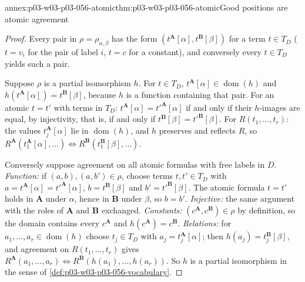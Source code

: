 \begin{annexitem}{annex:p03-w03-p03-056-atomic}{thm:p03-w03-p03-056-atomic}{Good positions are atomic agreement}
\begin{proof}
Every pair in \(\rho=\rho_{\alpha,\beta}\) has the form
\((t^{\mathbf A}[\alpha],t^{\mathbf B}[\beta])\) for a term \(t\in T_D\)
(\(t=v_i\) for the pair of label \(i\), \(t=c\) for a constant), and
conversely every \(t\in T_D\) yields such a pair.

Suppose \(\rho\) is a partial isomorphism \(h\). For \(t\in T_D\),
\(t^{\mathbf A}[\alpha]\in\operatorname{dom}(h)\) and
\(h(t^{\mathbf A}[\alpha])=t^{\mathbf B}[\beta]\), because \(h\) is a function
containing that pair. For an atomic \(t=t'\) with terms in \(T_D\):
\(t^{\mathbf A}[\alpha]=t'^{\mathbf A}[\alpha]\) if and only if their
\(h\)-images are equal, by injectivity, that is, if and only if
\(t^{\mathbf B}[\beta]=t'^{\mathbf B}[\beta]\). For \(R(t_1,\ldots,t_r)\): the
values \(t_j^{\mathbf A}[\alpha]\) lie in \(\operatorname{dom}(h)\), and
\(h\) preserves and reflects \(R\), so
\(R^{\mathbf A}(t_1^{\mathbf A}[\alpha],\ldots)\iff
R^{\mathbf B}(t_1^{\mathbf B}[\beta],\ldots)\).

Conversely suppose agreement on all atomic formulas with free labels in
\(D\). \emph{Function:} if \((a,b),(a,b')\in\rho\), choose terms
\(t,t'\in T_D\) with \(a=t^{\mathbf A}[\alpha]=t'^{\mathbf A}[\alpha]\),
\(b=t^{\mathbf B}[\beta]\) and \(b'=t'^{\mathbf B}[\beta]\). The atomic
formula \(t=t'\) holds in \(\mathbf A\) under \(\alpha\), hence in
\(\mathbf B\) under \(\beta\), so \(b=b'\). \emph{Injective:} the same
argument with the roles of \(\mathbf A\) and \(\mathbf B\) exchanged.
\emph{Constants:} \((c^{\mathbf A},c^{\mathbf B})\in\rho\) by definition, so
the domain contains every \(c^{\mathbf A}\) and \(h(c^{\mathbf A})=c^{\mathbf B}\).
\emph{Relations:} for \(a_1,\ldots,a_r\in\operatorname{dom}(h)\) choose
\(t_j\in T_D\) with \(a_j=t_j^{\mathbf A}[\alpha]\); then
\(h(a_j)=t_j^{\mathbf B}[\beta]\), and agreement on
\(R(t_1,\ldots,t_r)\) gives
\(R^{\mathbf A}(a_1,\ldots,a_r)\iff R^{\mathbf B}(h(a_1),\ldots,h(a_r))\).
So \(h\) is a partial isomorphism in the sense of
\cref{def:p03-w03-p03-056-vocabulary}.
\end{proof}
\end{annexitem}

